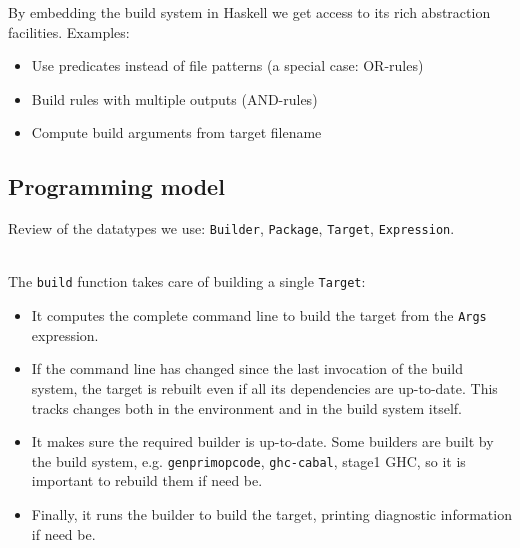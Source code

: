 By embedding the build system in Haskell we get access to its rich abstraction
facilities. Examples:
\begin{itemize}
  \item Use predicates instead of file patterns (a special case: OR-rules)
  \item Build rules with multiple outputs (AND-rules)
  \item Compute build arguments from target filename
\end{itemize}

\subsection{Programming model}

Review of the datatypes we use: \texttt{Builder}, \texttt{Package},
\texttt{Target}, \texttt{Expression}.

~\\
\noindent The \texttt{build} function takes care of building a single
\texttt{Target}:
\begin{itemize}
  \item It computes the complete command line to build the target from the
  \texttt{Args} expression.
  \item If the command line has changed since the last invocation of the build
  system, the target is rebuilt even if all its dependencies are up-to-date.
  This tracks changes both in the environment and in the build system itself.
  \item It makes sure the required builder is up-to-date. Some builders are
  built by the build system, e.g. \texttt{genprimopcode}, \texttt{ghc-cabal},
  stage1 GHC, so it is important to rebuild them if need be.
  \item Finally, it runs the builder to build the target, printing diagnostic
  information if need be.
\end{itemize}
